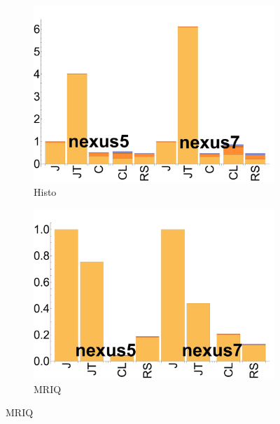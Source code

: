 \begin{figure}[tp]
  \begin{subfigure}[b]{0.24\textwidth}
      \centering
      \includegraphics[width=\textwidth]{data/bbattery_histogram.pdf}
      \caption{Histo}\label{fig:b_histo}
  \end{subfigure}%

  \begin{subfigure}[b]{0.24\textwidth}
      \centering
      \includegraphics[width=\textwidth]{data/bbattery_mriq.pdf}
      \caption{MRIQ} \label{fig:b_MRIQ}
  \end{subfigure}


\end{figure}
